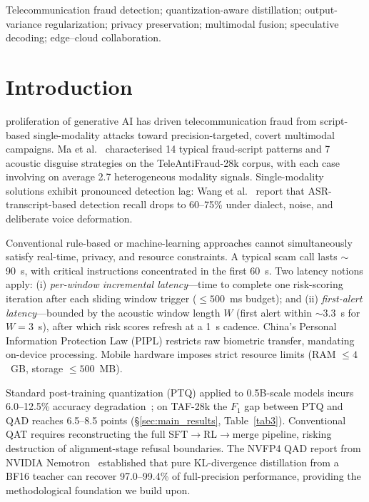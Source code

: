 \documentclass[lettersize,journal]{IEEEtran}
\begin{document}
\begin{IEEEkeywords}
Telecommunication fraud detection; quantization-aware distillation;
output-variance regularization; privacy preservation; multimodal
fusion; speculative decoding; edge--cloud collaboration.
\end{IEEEkeywords}

\section{Introduction}
 proliferation of generative AI has driven
telecommunication fraud from script-based single-modality attacks
toward precision-targeted, covert multimodal campaigns.  Ma et
al.~\cite{1} characterised 14 typical fraud-script patterns and 7
acoustic disguise strategies on the TeleAntiFraud-28k corpus, with
each case involving on average 2.7 heterogeneous modality signals.
Single-modality solutions exhibit pronounced detection lag: Wang et
al.~\cite{2} report that ASR-transcript-based detection recall drops
to 60--75\% under dialect, noise, and deliberate voice deformation.

Conventional rule-based or machine-learning approaches cannot
simultaneously satisfy real-time, privacy, and resource constraints.
A typical scam call lasts $\sim$90~s, with critical instructions
concentrated in the first 60~s.  Two latency notions apply: (i)
\emph{per-window incremental latency}---time to complete one
risk-scoring iteration after each sliding window trigger
($\le 500$~ms budget); and (ii) \emph{first-alert latency}---bounded
by the acoustic window length $W$ (first alert within $\sim$3.3~s for
$W=3$~s), after which risk scores refresh at a 1~s cadence.
China's Personal Information Protection Law (PIPL) restricts raw
biometric transfer, mandating on-device processing.  Mobile hardware
imposes strict resource limits (RAM $\le 4$~GB, storage $\le 500$~MB).

Standard post-training quantization (PTQ) applied to 0.5B-scale
models incurs 6.0--12.5\% accuracy degradation~\cite{3}; on TAF-28k
the $F_1$ gap between PTQ and QAD reaches 6.5--8.5 points
(\S\ref{sec:main_results}, Table~\ref{tab3}).  Conventional QAT
requires reconstructing the full SFT$\rightarrow$RL$\rightarrow$merge
pipeline, risking destruction of alignment-stage refusal boundaries.
The NVFP4 QAD report from NVIDIA Nemotron~\cite{3} established that
pure KL-divergence distillation from a BF16 teacher can recover
97.0--99.4\% of full-precision performance, providing the
methodological foundation we build upon.
\end{document}
